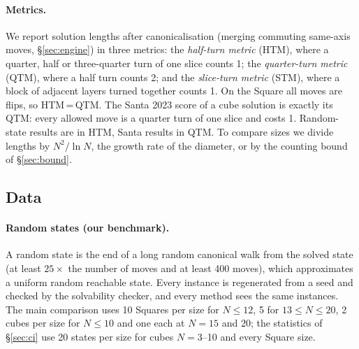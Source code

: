 \paragraph{Metrics.}
We report solution lengths after canonicalisation (merging commuting same-axis moves, \S\ref{sec:engine}) in three
metrics: the \emph{half-turn metric} (HTM), where a quarter, half or three-quarter turn of one slice counts 1; the
\emph{quarter-turn metric} (QTM), where a half turn counts 2; and the \emph{slice-turn metric} (STM), where a block
of adjacent layers turned together counts 1. On the Square all moves are flips, so HTM\,=\,QTM. The Santa 2023 score
of a cube solution is exactly its QTM: every allowed move is a quarter turn of one slice and costs 1. Random-state
results are in HTM, Santa results in QTM. To compare sizes we divide lengths by $N^2/\ln N$, the growth rate of
the diameter, or by the counting bound of \S\ref{sec:bound}.

\subsection{Data}
\label{sec:data}

\paragraph{Random states (our benchmark).}
A random state is the end of a long random canonical walk from the solved state (at least $25\times$ the number of
moves and at least 400 moves), which approximates a uniform random reachable state. Every instance is regenerated
from a seed and checked by the solvability checker, and every method sees the same instances. The main comparison
uses 10 Squares per size for $N\le12$, 5 for $13\le N\le20$, 2 cubes per size for $N\le10$ and one each at $N=15$
and $20$; the statistics of \S\ref{sec:ci} use 20 states per size for cubes $N=3$--10 and every Square size.

